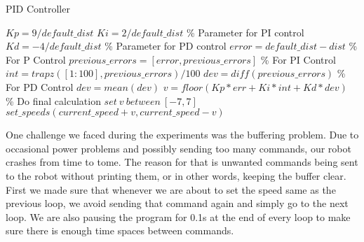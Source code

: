 \documentclass[]{article}
\begin{document}
\begin{center}
\begin{algorithm}                      %
\caption{PID Controller}          %
\label{alg1}                           %
\begin{algorithmic}                    %

    \STATE $Kp = 9/default\_dist$ 
    \STATE $Ki = 2/default\_dist$ \COMMENT \% Parameter for PI control
    \STATE $Kd = -4/default\_dist$ \COMMENT \% Parameter for PD control
    \STATE 
    \STATE $error = default\_dist - dist$ \COMMENT \% For P Control
    \STATE
    \STATE $previous\_errors = [error, previous\_errors]$ \COMMENT \% For PI Control
    \STATE $int = trapz([1:100], previous\_errors)/100$ 
    \STATE
    \STATE $dev = diff(previous\_errors)$ \COMMENT \% For PD Control
    \STATE $dev = mean(dev)$
    \STATE
    \STATE $v = floor(Kp*err + Ki*int + Kd*dev)$ \COMMENT \% Do final calculation
    \STATE $set \ v \ between \ [-7,7]$
    \STATE $set\_speeds(current\_speed+v, current\_speed-v)$
\end{algorithmic}
\end{algorithm}
\end{center}
One challenge we faced during the experiments was the buffering problem. Due to occasional power problems and possibly sending too many commands, our robot crashes from time to tome. The reason for that is unwanted commands being sent to the robot without printing them, or in other words, keeping the buffer clear. First we made sure that whenever we are about to set the speed same as the previous loop, we avoid sending that command again and simply go to the next loop. We are also pausing the program for 0.1s at the end of every loop to make sure there is enough time spaces between commands.    
\end{document}
